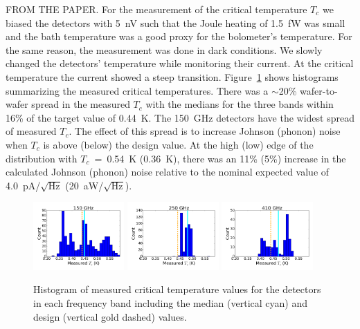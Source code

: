 FROM THE PAPER.
For the measurement of the critical temperature $T_{c}$ we biased the detectors with 5~nV such that the Joule heating of 1.5~fW was 
small and the bath temperature was a good proxy for the bolometer's temperature. For the same reason, the measurement was 
done in dark conditions. We slowly changed the detectors' temperature while monitoring their current. 
At the critical temperature the current showed a steep transition.
Figure~\ref{fig:tc_histograms} shows histograms summarizing the measured critical temperatures. There 
was a $\sim$20\% wafer-to-wafer spread in the measured $T_{c}$ with the medians for the three bands within 
16\% of the target value of 0.44~K. 
The 150~GHz detectors have the widest spread of measured $T_{c}$. The effect of this spread is to increase Johnson (phonon) 
noise when $T_{c}$ is above (below) the design value. 
At the high (low) edge of the distribution with $T_{c}$~=~0.54~K (0.36~K), there was an 11\% (5\%) increase in the calculated Johnson (phonon) noise 
relative to the nominal expected value of 4.0~pA/$\sqrt{\mathrm{Hz}}$ (20~aW/$\sqrt{\mathrm{Hz}}$). 



\begin{figure}[ht!]
\centering
\includegraphics[width=0.31\textwidth]{figures/150_tc_hist.png}
\includegraphics[width=0.31\textwidth]{figures/250_tc_hist.png}
\includegraphics[width=0.31\textwidth]{figures/410_tc_hist.png}
\caption{Histogram of measured critical temperature values for the detectors in each frequency band including the median (vertical cyan) and design (vertical gold dashed) values. 
\label{fig:tc_histograms} }
\end{figure}

